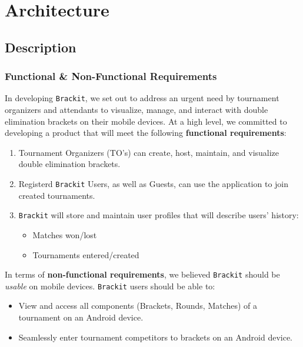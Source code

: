 \documentclass{article}
\begin{document}
\section{Architecture}
\subsection{Description}
\subsubsection{Functional \& Non-Functional Requirements}
In developing \texttt{Brackit}, we set out to address an urgent need by tournament organizers and attendants to visualize, manage, and interact with double elimination
brackets on their mobile devices. At a high level, we committed to developing a product that will meet the following \textbf{functional requirements}:
\begin{enumerate}
    \item{Tournament Organizers (TO's) can create, host, maintain, and visualize double elimination brackets.}
    \item{Registerd \texttt{Brackit} Users, as well as Guests, can use the application to join created tournaments.}
    \item{\texttt{Brackit} will store and maintain user profiles that will describe users' history:
    \begin{itemize}
        \item{Matches won/lost}
        \item{Tournaments entered/created}
    \end{itemize}
    }
\end{enumerate}
In terms of \textbf{non-functional requirements}, we believed \texttt{Brackit} should be \textit{usable} on mobile devices. \texttt{Brackit} users should be able to:
\begin{itemize}
    \item{View and access all components (Brackets, Rounds, Matches) of a tournament on an Android device.}
    \item{Seamlessly enter tournament competitors to brackets on an Android device.}
\end{itemize}
\end{document}
